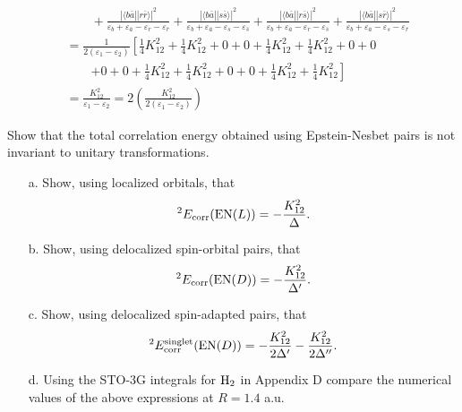 \documentclass[a4paper]{book}
\newcommand{\corr}{{\rm corr}}
\begin{document}
\begin{solution}
\begin{align*}
	&\hspace{2em} + \frac{ | \langle b \bar{a} || r \bar{r} \rangle |^2 }{ \varepsilon_b + \varepsilon_{\bar{a}} - \varepsilon_r - \varepsilon_{\bar{r}} }	+ \frac{ | \langle b \bar{a} || s \bar{s} \rangle |^2 }{ \varepsilon_b + \varepsilon_{\bar{a}} - \varepsilon_s - \varepsilon_{\bar{s}} } + \frac{ | \langle b \bar{a} || r \bar{s} \rangle |^2 }{ \varepsilon_b + \varepsilon_{\bar{a}} - \varepsilon_r - \varepsilon_{\bar{s}} } + \frac{ | \langle b \bar{a} || s \bar{r} \rangle |^2 }{ \varepsilon_b + \varepsilon_{\bar{a}} - \varepsilon_s - \varepsilon_{\bar{r}} } \\
	&= \frac{1}{2(\varepsilon_1 - \varepsilon_2)} \left[ \frac{1}{4} K^2_{12} + \frac{1}{4} K^2_{12} + 0 + 0 + \frac{1}{4} K^2_{12} + \frac{1}{4} K^2_{12} + 0 + 0 \right. \\
	&\hspace{2em} \left. + 0 + 0 + \frac{1}{4} K^2_{12} + \frac{1}{4} K^2_{12} + 0 + 0 + \frac{1}{4} K^2_{12} + \frac{1}{4} K^2_{12} \right] \\
	&= \frac{ K^2_{12} }{ \varepsilon_1 - \varepsilon_2 } = 2 \left( \frac{ K^2_{12} }{ 2 ( \varepsilon_1 - \varepsilon_2 ) } \right)
	\end{align*}		
	
	\end{solution}
	
	\begin{exercise}
	Show that the total correlation energy obtained using Epstein-Nesbet pairs is not invariant to unitary transformations.
	\begin{enumerate}
	
	\item[a.] Show, using localized orbitals, that
	\[
		{}^{2} E_\corr({\rm EN}(L)) = - \frac{K^2_{12}}{\Delta}.
	\]
	
	\item[b.] Show, using delocalized spin-orbital pairs, that
	\[
		{}^{2} E_\corr({\rm EN}(D)) = - \frac{K^2_{12}}{\Delta^\prime}.
	\]
	
	\item[c.] Show, using delocalized spin-adapted pairs, that
	\[
		{}^{2} E^{\rm singlet}_\corr({\rm EN}(D)) = - \frac{ K^2_{12} }{ 2 \Delta^\prime } - \frac{ K^2_{12} }{ 2 \Delta^{\prime\prime} }.
	\]
	
	\item[d.] Using the STO-3G integrals for $\ce{H2}$ in Appendix D compare the numerical values of the above expressions at $R=1.4$ a.u.
	\end{enumerate}
	\end{exercise}
	
\end{document}
